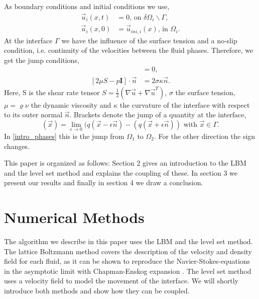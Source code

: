 \documentclass[final,leqno,onefignum,onetabnum]{siamltexmm}
\begin{document}
As boundary conditions and initial conditions we use,
\begin{align}
  \vec u_i(x,t) &= 0 \text{, on } \delta\Omega_i \backslash \Gamma \text{,} \\
  \vec u_i(x,0) &= \vec u_{ini,i}(x) \text{, in } \Omega_i \text{.}
\end{align}
At the interface $\Gamma$ we have the influence of the surface tension and a no-slip condition, i.e. continuity of the velocities between the fluid phases. Therefore, we get the jump conditions,
\begin{align}
  [\vec u] &= 0 \text{,  } \\
  [2\mu S - p \mathbf{I}] \cdot \vec n &= 2 \sigma \kappa \vec n \text{.}
	\label{jumpconditions}
\end{align}
Here, S is the shear rate tensor $S=\frac12 \left( \nabla \vec u + \nabla {\vec u}^T\right)$, $\sigma$ the surface tension, $\mu = \varrho \nu$ the dynamic viscosity and $\kappa$ the curvature of the interface with respect to its outer normal $\vec n$. Brackets denote the jump of a quantity at the interface, 
\begin{equation}
	[q](\vec x) = \lim_{\epsilon \rightarrow 0} (q(\vec x - \epsilon \vec n) - (q(\vec x + \epsilon \vec n)) \text{ with } \vec x \in \Gamma. %
\end{equation}
In \cref{intro_phases} this is the jump from $\Omega_1$ to $\Omega_2$. For the other direction the sign changes.

This paper is organized as follows: Section 2 gives an introduction to the LBM and the level set method and explains the coupling of these. In section 3 we present our results and finally in section 4 we draw a conclusion.

\section{Numerical Methods}
The algorithm we describe in this paper uses the LBM and the level set method. The lattice Boltzmann method covers the description of the velocity and density field for each fluid, as it can be shown to reproduce the Navier-Stokes-equations in the asymptotic limit with Chapman-Enskog expansion \cite{LBM3}. The level set method uses a velocity field to model the movement of the interface. We will shortly introduce both methods and show how they can be coupled.
\end{document}
